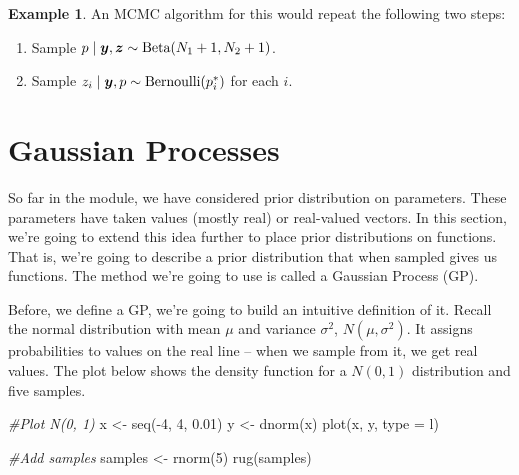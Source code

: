 \documentclass[
]{book}
\newenvironment{Shaded}{\begin{snugshade}}{\end{snugshade}}
\newcommand{\AttributeTok}[1]{\textcolor[rgb]{0.77,0.63,0.00}{#1}}
\newcommand{\CommentTok}[1]{\textcolor[rgb]{0.56,0.35,0.01}{\textit{#1}}}
\newcommand{\DecValTok}[1]{\textcolor[rgb]{0.00,0.00,0.81}{#1}}
\newcommand{\FloatTok}[1]{\textcolor[rgb]{0.00,0.00,0.81}{#1}}
\newcommand{\FunctionTok}[1]{\textcolor[rgb]{0.00,0.00,0.00}{#1}}
\newcommand{\NormalTok}[1]{#1}
\newcommand{\OtherTok}[1]{\textcolor[rgb]{0.56,0.35,0.01}{#1}}
\newcommand{\SpecialCharTok}[1]{\textcolor[rgb]{0.00,0.00,0.00}{#1}}
\newcommand{\StringTok}[1]{\textcolor[rgb]{0.31,0.60,0.02}{#1}}
\providecommand{\tightlist}{%
  \setlength{\itemsep}{0pt}\setlength{\parskip}{0pt}}
\theoremstyle{definition}
\theoremstyle{definition}
\newtheorem{example}{Example}[chapter]
\theoremstyle{definition}
\theoremstyle{definition}
\theoremstyle{remark}
\begin{document}
\begin{example}
An MCMC algorithm for this would repeat the following two steps:

\begin{enumerate}
\def\labelenumi{\arabic{enumi}.}
\tightlist
\item
  Sample \(p \mid \boldsymbol{y}, \boldsymbol{z} \sim \hbox{Beta}(N_1 + 1, N_2 + 1)\).
\item
  Sample \(z_i \mid \boldsymbol{y}, p \sim \hbox{Bernoulli}(p^*_i)\) for each \(i\).
\end{enumerate}

\end{example}

\hypertarget{gaussian-processes}{%
\section{Gaussian Processes}\label{gaussian-processes}}

So far in the module, we have considered prior distribution on parameters. These parameters have taken values (mostly real) or real-valued vectors. In this section, we're going to extend this idea further to place prior distributions on functions. That is, we're going to describe a prior distribution that when sampled gives us functions. The method we're going to use is called a Gaussian Process (GP).

Before, we define a GP, we're going to build an intuitive definition of it. Recall the normal distribution with mean \(\mu\) and variance \(\sigma^2\), \(N(\mu, \sigma^2)\). It assigns probabilities to values on the real line -- when we sample from it, we get real values. The plot below shows the density function for a \(N(0, 1)\) distribution and five samples.

\begin{Shaded}
\begin{Highlighting}[]
\CommentTok{\#Plot N(0, 1)}
\NormalTok{x }\OtherTok{\textless{}{-}} \FunctionTok{seq}\NormalTok{(}\SpecialCharTok{{-}}\DecValTok{4}\NormalTok{, }\DecValTok{4}\NormalTok{, }\FloatTok{0.01}\NormalTok{)}
\NormalTok{y }\OtherTok{\textless{}{-}} \FunctionTok{dnorm}\NormalTok{(x)}
\FunctionTok{plot}\NormalTok{(x, y, }\AttributeTok{type =} \StringTok{\textquotesingle{}l\textquotesingle{}}\NormalTok{)}

\CommentTok{\#Add samples}
\NormalTok{samples }\OtherTok{\textless{}{-}} \FunctionTok{rnorm}\NormalTok{(}\DecValTok{5}\NormalTok{)}
\FunctionTok{rug}\NormalTok{(samples)}
\end{Highlighting}
\end{Shaded}
\end{document}
